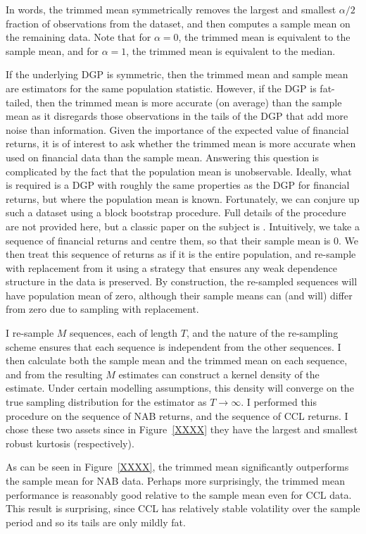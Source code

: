 \documentclass[12pt,a4paper]{amsart}
\renewcommand{\a}{\alpha}
\newcommand{\can}{\citeasnoun}							%
\newcommand{\ra}{\rightarrow}							%
\begin{document}
In words, the trimmed mean symmetrically removes the largest and smallest $\a / 2$ fraction of observations from the dataset, and then computes a sample mean on the remaining data. Note that for $\a = 0$, the trimmed mean is equivalent to the sample mean, and for $\a = 1$, the trimmed mean is equivalent to the median.

If the underlying DGP is symmetric, then the trimmed mean and sample mean are estimators for the same population statistic. However, if the DGP is fat-tailed, then the trimmed mean is more accurate (on average) than the sample mean as it disregards those observations in the tails of the DGP that add more noise than information. Given the importance of the expected value of financial returns, it is of interest to ask whether the trimmed mean is more accurate when used on financial data than the sample mean. Answering this question is complicated by the fact that the population mean is unobservable. Ideally, what is required is a DGP with roughly the same properties as the DGP for financial returns, but where the population mean is known. Fortunately, we can conjure up such a dataset using a block bootstrap procedure. Full details of the procedure are not provided here, but a classic paper on the subject is \can{Politis_Romano_(1994)}. Intuitively, we take a sequence of financial returns and centre them, so that their sample mean is $0$. We then treat this sequence of returns as if it is the entire population, and re-sample with replacement from it using a strategy that ensures any weak dependence structure in the data is preserved. By construction, the re-sampled sequences will have population mean of zero, although their sample means can (and will) differ from zero due to sampling with replacement.

I re-sample $M$ sequences, each of length $T$, and the nature of the re-sampling scheme ensures that each sequence is independent from the other sequences. I then calculate both the sample mean and the trimmed mean on each sequence, and from the resulting $M$ estimates can construct a kernel density of the estimate. Under certain modelling assumptions, this density will converge on the true sampling distribution for the estimator as $T \ra \infty$. I performed this procedure on the sequence of NAB returns, and the sequence of CCL returns. I chose these two assets since in Figure~\ref{XXXX} they have the largest and smallest robust kurtosis (respectively).

As can be seen in Figure~\ref{XXXX}, the trimmed mean significantly outperforms the sample mean for NAB data. Perhaps more surprisingly, the trimmed mean performance is reasonably good relative to the sample mean even for CCL data. This result is surprising, since CCL has relatively stable volatility over the sample period and so its tails are only mildly fat.
\end{document}

